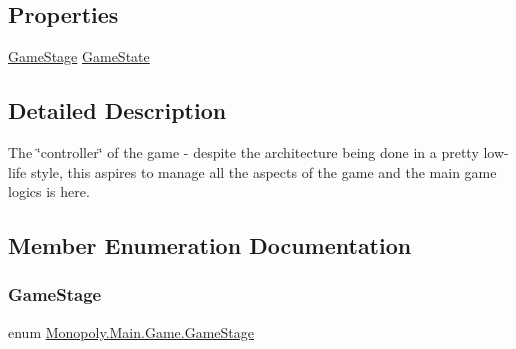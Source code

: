 \subsection*{Properties}
\begin{DoxyCompactItemize}
\item 
\mbox{\hyperlink{class_monopoly_1_1_main_1_1_game_a52e7aaac8429c63b99ced40e268d03e2}{Game\+Stage}} \mbox{\hyperlink{class_monopoly_1_1_main_1_1_game_a40a5d10028e3f69cd01cef1b513fcc48}{Game\+State}}
\end{DoxyCompactItemize}


\subsection{Detailed Description}
The \char`\"{}controller\char`\"{} of the game -\/ despite the architecture being done in a pretty low-\/life style, this aspires to manage all the aspects of the game and the main game logics is here. 

\subsection{Member Enumeration Documentation}
\mbox{\label{class_monopoly_1_1_main_1_1_game_a52e7aaac8429c63b99ced40e268d03e2}} 
\subsubsection{\texorpdfstring{Game\+Stage}{GameStage}}
{\footnotesize\ttfamily enum \mbox{\hyperlink{class_monopoly_1_1_main_1_1_game_a52e7aaac8429c63b99ced40e268d03e2}{Monopoly.\+Main.\+Game.\+Game\+Stage}}\hspace{0.3cm}{\ttfamily [strong]}}

